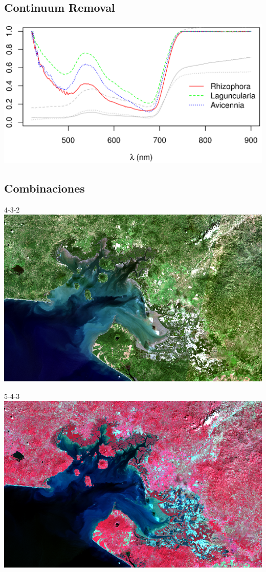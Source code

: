 \documentclass[12pt]{beamer}
\begin{document}
\subsection{Continuum Removal}
\begin{frame}
	\includegraphics[width=\linewidth]{./Graficos/ContinuumR2.eps}
\end{frame}

\subsection{Combinaciones}
\begin{frame}{{\footnotesize 4-3-2}}
	\centering
	\includegraphics[width=0.8\linewidth]{./Imagenes/GF432.png}
\end{frame}

\begin{frame}{{\footnotesize 5-4-3}}
	\centering
	\includegraphics[width=0.8\linewidth]{./Imagenes/GF543.png}
\end{frame}
\end{document}
